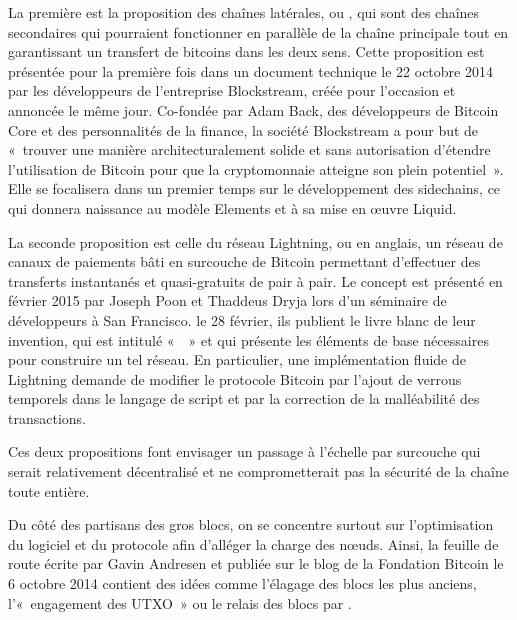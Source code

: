La première est la proposition des chaînes latérales, ou , qui sont des chaînes secondaires qui pourraient fonctionner en parallèle de la chaîne principale tout en garantissant un transfert de bitcoins dans les deux sens. Cette proposition est présentée pour la première fois dans un document technique le 22 octobre 2014 par les développeurs de l'entreprise Blockstream, créée pour l'occasion et annoncée le même jour. Co-fondée par Adam Back, des développeurs de Bitcoin Core et des personnalités de la finance, la société Blockstream a pour but de «~trouver une manière architecturalement solide et sans autorisation d'étendre l'utilisation de Bitcoin pour que la cryptomonnaie atteigne son plein potentiel~». Elle se focalisera dans un premier temps sur le développement des sidechains, ce qui donnera naissance au modèle Elements et à sa mise en œuvre Liquid.


La seconde proposition est celle du réseau Lightning, ou  en anglais, un réseau de canaux de paiements bâti en surcouche de Bitcoin permettant d'effectuer des transferts instantanés et quasi-gratuits de pair à pair. Le concept est présenté en février 2015 par Joseph Poon et Thaddeus Dryja lors d'un séminaire de développeurs à San Francisco. le 28 février, ils publient le livre blanc de leur invention, qui est intitulé «~~» et qui présente les éléments de base nécessaires pour construire un tel réseau. En particulier, une implémentation fluide de Lightning demande de modifier le protocole Bitcoin par l'ajout de verrous temporels dans le langage de script et par la correction de la malléabilité des transactions.

Ces deux propositions font envisager un passage à l'échelle par surcouche qui serait relativement décentralisé et ne comprometterait pas la sécurité de la chaîne toute entière.

Du côté des partisans des gros blocs, on se concentre surtout sur l'optimisation du logiciel et du protocole afin d'alléger la charge des nœuds. Ainsi, la feuille de route écrite par Gavin Andresen et publiée sur le blog de la Fondation Bitcoin le 6 octobre 2014 contient des idées comme l'élagage des blocs les plus anciens, l'«~engagement des UTXO~» ou le relais des blocs par .

